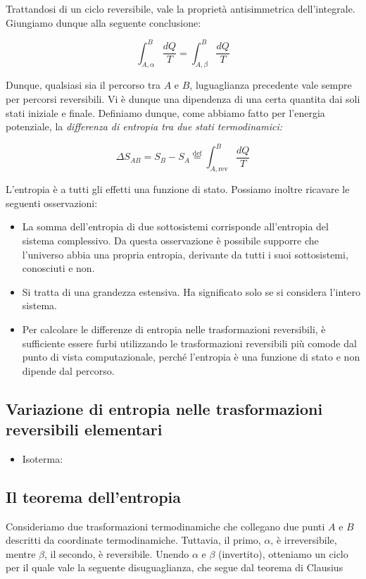\noindent Trattandosi di un ciclo reversibile, vale la proprietà
antisimmetrica dell'integrale. Giungiamo dunque alla seguente conclusione:

\[ \int_{A,\alpha}^{B} \frac{dQ}{T} = \int_{A,\beta}^{B} \frac{dQ}{T} \]

\noindent Dunque, qualsiasi sia il percorso tra $A$ e $B$, luguaglianza
precedente vale sempre per percorsi reversibili. Vi è dunque una dipendenza
di una certa quantita dai soli stati iniziale e finale. Definiamo dunque,
come abbiamo fatto per l'energia potenziale, la \textit{differenza di
entropia tra due stati termodinamici:}

\[ \Delta S_{AB} = S_B - S_A \stackrel{\text{def}}{=} \int_{A,\text{rev}}^{B} \frac{dQ}{T} \]

\noindent L'entropia è a tutti gli effetti una funzione di stato. Possiamo
inoltre ricavare le seguenti osservazioni:

\begin{itemize}
    \item La somma dell'entropia di due sottosistemi corrisponde all'entropia
    del sistema complessivo. Da questa osservazione è possibile supporre
    che l'universo abbia una propria entropia, derivante da tutti i suoi
    sottosistemi, conosciuti e non.

    \item Si tratta di una grandezza estensiva. Ha significato solo se si
    considera l'intero sistema.

    \item Per calcolare le differenze di entropia nelle trasformazioni
    reversibili, è sufficiente essere furbi utilizzando le trasformazioni
    reversibili più comode dal punto di vista computazionale, perché
    l'entropia è una funzione di stato e non dipende dal percorso.
\end{itemize}

\subsection{Variazione di entropia nelle trasformazioni reversibili elementari}
\begin{itemize}
    \item Isoterma:
\end{itemize}


\subsection{Il teorema dell'entropia}
Consideriamo due trasformazioni termodinamiche che collegano due punti
$A$ e $B$ descritti da coordinate termodinamiche. Tuttavia, il primo,
$\alpha$, è irreversibile, mentre $\beta$, il secondo, è reversibile.
Unendo $\alpha$ e $\beta$ (invertito), otteniamo un ciclo per il quale
vale la seguente disuguaglianza, che segue dal teorema di Clausius

